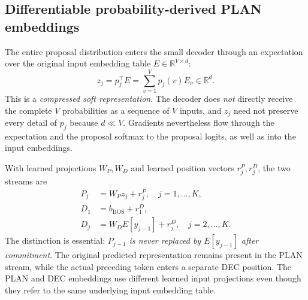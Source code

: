 \documentclass[11pt,letterpaper]{article}
\newcommand{\R}{\mathbb{R}}
\begin{document}
\subsection{Differentiable probability-derived PLAN embeddings}
The entire proposal distribution enters the small decoder through an expectation over the original input embedding table $E\in\R^{V\times d}$:
\begin{equation}
  z_j=p_j^\top E =\sum_{v=1}^{V}p_j(v)E_v\in\R^{d}.
  \label{eq:expectation}
\end{equation}
This is a \emph{compressed soft representation}. The decoder does \emph{not} directly receive the complete $V$ probabilities as a sequence of $V$ inputs, and $z_j$ need not preserve every detail of $p_j$ because $d\ll V$. Gradients nevertheless flow through the expectation and the proposal softmax to the proposal logits, as well as into the input embeddings.

With learned projections $W_P,W_D$ and learned position vectors $r^P_j,r^D_j$, the two streams are
\begin{align}
  P_j &= W_Pz_j+r^P_j,\quad j=1,\ldots,K,\\
  D_1 &= b_{\mathrm{BOS}}+r^D_1,\\
  D_j &= W_DE[y_{j-1}]+r^D_j,\quad j=2,\ldots,K.
  \label{eq:streams}
\end{align}
The distinction is essential: \emph{$P_{j-1}$ is never replaced by $E[y_{j-1}]$ after commitment}. The original predicted representation remains present in the PLAN stream, while the actual preceding token enters a separate DEC position. The PLAN and DEC embeddings use different learned input projections even though they refer to the same underlying input embedding table.
\end{document}
